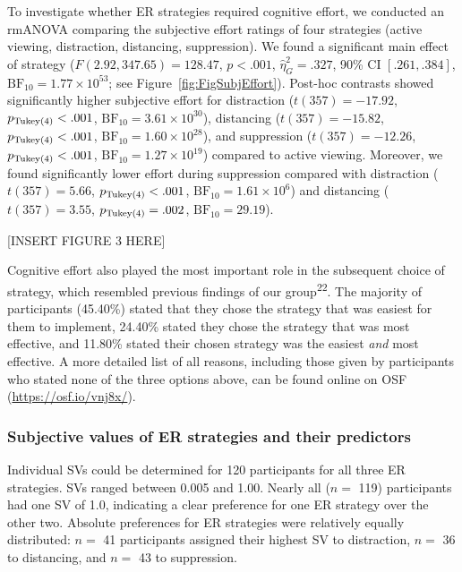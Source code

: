 \documentclass[
  man,floatsintext]{apa6}
\begin{document}
To investigate whether ER strategies required cognitive effort, we conducted an rmANOVA comparing the subjective effort ratings of four strategies (active viewing, distraction, distancing, suppression).
We found a significant main effect of strategy (\(F(2.92, 347.65) = 128.47\), \(p < .001\), \(\hat{\eta}^2_G = .327\), 90\% CI \([.261, .384]\), \(\mathrm{BF}_{\textrm{10}} = 1.77 \times 10^{53}\); see Figure~\ref{fig:FigSubjEffort}).
Post-hoc contrasts showed significantly higher subjective effort for distraction (\(t(357) = -17.92\), \(p_\mathrm{\scriptsize Tukey(4)} < .001\), \(\mathrm{BF}_{\textrm{10}} = 3.61 \times 10^{30}\)), distancing (\(t(357) = -15.82\), \(p_\mathrm{\scriptsize Tukey(4)} < .001\), \(\mathrm{BF}_{\textrm{10}} = 1.60 \times 10^{28}\)), and suppression (\(t(357) = -12.26\), \(p_\mathrm{\scriptsize Tukey(4)} < .001\), \(\mathrm{BF}_{\textrm{10}} = 1.27 \times 10^{19}\)) compared to active viewing.
Moreover, we found significantly lower effort during suppression compared with distraction (\(t(357) = 5.66\), \(p_\mathrm{\scriptsize Tukey(4)} < .001\), \(\mathrm{BF}_{\textrm{10}} = 1.61 \times 10^{6}\)) and distancing (\(t(357) = 3.55\), \(p_\mathrm{\scriptsize Tukey(4)} = .002\), \(\mathrm{BF}_{\textrm{10}} = 29.19\)).

{[}INSERT FIGURE 3 HERE{]}

Cognitive effort also played the most important role in the subsequent choice of strategy, which resembled previous findings of our group\textsuperscript{22}.
The majority of participants (45.40\%) stated that they chose the strategy that was easiest for them to implement, 24.40\% stated they chose the strategy that was most effective, and 11.80\% stated their chosen strategy was the easiest \emph{and} most effective.
A more detailed list of all reasons, including those given by participants who stated none of the three options above, can be found online on OSF (\url{https://osf.io/vnj8x/}).

\hypertarget{subjective-values-of-er-strategies-and-their-predictors}{%
\subsubsection{Subjective values of ER strategies and their predictors}\label{subjective-values-of-er-strategies-and-their-predictors}}

Individual SVs could be determined for 120 participants for all three ER strategies.
SVs ranged between 0.005 and 1.00.
Nearly all (\(n=\) 119) participants had one SV of 1.0, indicating a clear preference for one ER strategy over the other two.
Absolute preferences for ER strategies were relatively equally distributed: \(n=\) 41 participants assigned their highest SV to distraction, \(n=\) 36 to distancing, and \(n=\) 43 to suppression.
\end{document}

